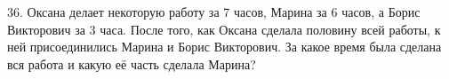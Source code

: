36. Оксана делает некоторую работу за 7 часов, Марина за 6 часов, а Борис Викторович за 3 часа. После того, как Оксана сделала половину всей работы, к ней присоединились Марина и Борис Викторович. За какое время была сделана вся работа и какую её часть сделала Марина?\\
